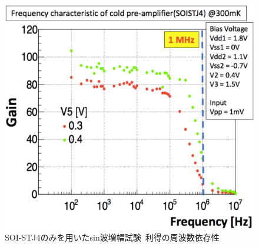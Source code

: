 			\begin{figure}[htbp]
				\begin{center}
					\includegraphics[width=12.0cm]{./Chapter/Chapter4/Picture/SOISTJ4woSTJ_frequency.eps}
					\caption{SOI-STJ4のみを用いたsin波増幅試験\ 利得の周波数依存性}
					\label{fig:SOISTJ4woSTJ_frequency}
				\end{center}
			\end{figure}
			\clearpage
			
		
